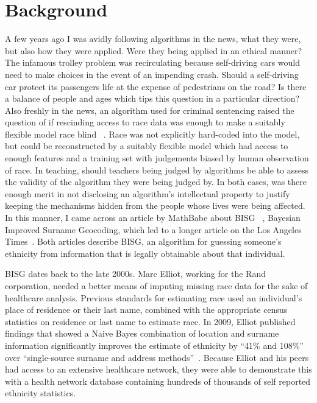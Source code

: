 \chapter{Background}
\label{chap:Background}
A few years ago I was avidly following algorithms in the news, what they were, but also how they were applied.  Were they being applied in an ethical manner?  The infamous trolley problem was recirculating because self-driving cars would need to make choices in the event of an impending crash.  Should a self-driving car protect its passengers life at the expense of pedestrians on the road?  Is there a balance of people and ages which tips this question in a particular direction?  Also freshly in the news, an algorithm used for criminal sentencing raised the question of if rescinding access to race data was enough to make a suitably flexible model race blind ~\citep{BOOK:5}.  Race was not explicitly hard-coded into the model, but could be reconstructed by a suitably flexible model which had access to enough features and a training set with judgements biased by human observation of race.  In teaching, should teachers being judged by algorithms be able to assess the validity of the algorithm they were being judged by.  In both cases, was there enough merit in not disclosing an algorithm's intellectual property to justify keeping the mechanisms hidden from the people whose lives were being affected.  In this manner, I came across an article by MathBabe about BISG ~\citep{WEBSITE:2}, Bayesian Improved Surname Geocoding, which led to a longer article on the Los Angeles Times~\citep{WEBSITE:1}.  Both articles describe BISG, an algorithm for guessing someone’s ethnicity from information that is legally obtainable about that individual.

\par BISG dates back to the late 2000s.  Marc Elliot, working for the Rand corporation, needed a better means of imputing missing race data for the sake of healthcare analysis.  Previous standards for estimating race used an individual’s place of residence or their last name, combined with the appropriate census statistics on residence or last name to estimate race.  In 2009, Elliot published findings that showed a Naive Bayes combination of location and surname information significantly improves the estimate of ethnicity by “41\% and 108\%” over “single-source surname and address methods”~\citep{WEBSITE:1}.  Because Elliot and his peers had access to an extensive healthcare network, they were able to demonstrate this with a health network database containing hundreds of thousands of self reported ethnicity statistics.

